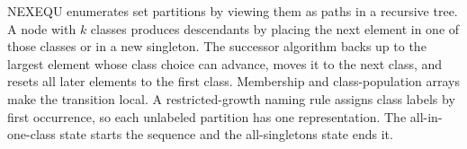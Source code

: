 \documentclass[10pt,letterpaper]{article}
\begin{document}
\begin{tcolorbox}[colback=Ink!4,colframe=Ink,title=Cornell summary]
NEXEQU enumerates set partitions by viewing them as paths in a recursive tree. A node with $k$ classes produces descendants by placing the next element in one of those classes or in a new singleton. The successor algorithm backs up to the largest element whose class choice can advance, moves it to the next class, and resets all later elements to the first class. Membership and class-population arrays make the transition local. A restricted-growth naming rule assigns class labels by first occurrence, so each unlabeled partition has one representation. The all-in-one-class state starts the sequence and the all-singletons state ends it.
\end{tcolorbox}
\end{document}

